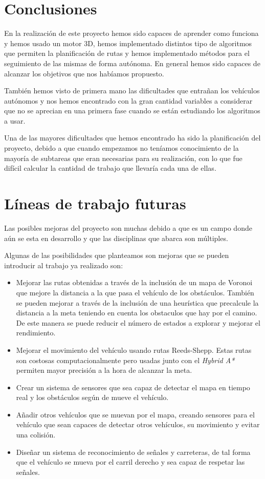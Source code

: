
\section{Conclusiones}
En la realización de este proyecto hemos sido capaces de aprender como funciona y hemos usado un motor 3D, hemos implementado distintos tipo de algoritmos que permiten la planificación de rutas y hemos implementado métodos para el seguimiento de las mismas de forma autónoma. En general hemos sido capaces de alcanzar los objetivos que nos habíamos propuesto.

También hemos visto de primera mano las dificultades que entrañan los vehículos autónomos y nos hemos encontrado con la gran cantidad variables a considerar que no se aprecian en una primera fase cuando se están estudiando los algoritmos a usar.

Una de las mayores dificultades que hemos encontrado ha sido la planificación del proyecto, debido a que cuando empezamos no teníamos conocimiento de la mayoría de subtareas que eran necesarias para su realización, con lo que fue difícil calcular la cantidad de trabajo que llevaría cada una de ellas.

\section{Líneas de trabajo futuras}
Las posibles mejoras del proyecto son muchas debido a que es un campo donde aún se esta en desarrollo y que las disciplinas que abarca son múltiples.

Algunas de las posibilidades que planteamos son mejoras que se pueden introducir al trabajo ya realizado son:
\begin{itemize}
\item Mejorar las rutas obtenidas a través de la inclusión de un mapa de Voronoi que mejore la distancia a la que pasa el vehículo de los obstáculos. También se pueden mejorar a través de la inclusión de una heurística que precalcule la distancia a la meta teniendo en cuenta los obstaculos que hay por el camino. De este manera se puede reducir el número de estados a explorar y mejorar el rendimiento.
\item Mejorar el movimiento del vehículo usando rutas Reeds-Shepp. Estas rutas son costosas computacionalmente pero usadas junto con el \textit{Hybrid A*} permiten mayor precisión a la hora de alcanzar la meta.
\item Crear un sistema de sensores que sea capaz de detectar el mapa en tiempo real y los obstáculos según de mueve el vehículo.
\item Añadir otros vehículos que se muevan por el mapa, creando sensores para el vehículo que sean capaces de detectar otros vehículos, su movimiento y evitar una colisión.
\item Diseñar un sistema de reconocimiento de señales y carreteras, de tal forma que el vehículo se mueva por el carril derecho y sea capaz de respetar las señales.
\end{itemize}
